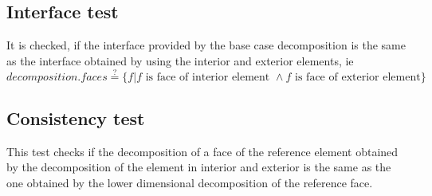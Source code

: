 \documentclass[a4paper, 11pt]{scrartcl}
\begin{document}
\subsection*{Interface test}
It is checked, if the interface provided by the base case decomposition is the same as the interface obtained by using the interior and exterior elements, ie \\
$decomposition.faces \stackrel{?}{=} \lbrace f | f\text{ is face of interior element }\wedge f\text{ is face of exterior element}\rbrace$
\subsection*{Consistency test}
This test checks if the decomposition of a face of the reference element obtained by the decomposition of the element in interior and exterior is the same as the one obtained by the lower dimensional decomposition of the reference face.
\end{document}
